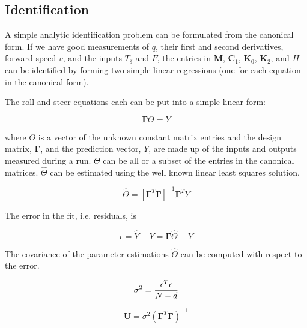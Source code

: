 \documentclass[a4paper]{article}
\begin{document}
\subsection{Identification}

A simple analytic identification problem can be formulated from the canonical
form. If we have good measurements of $q$, their first and second derivatives,
forward speed $v$, and the inputs $T_\delta$ and $F$, the entries in
$\mathbf{M}$, $\mathbf{C}_1$, $\mathbf{K}_0$, $\mathbf{K}_2$, and $H$ can be
identified by forming two simple linear regressions (one for each equation
in the canonical form).

The roll and steer equations each can be put into a simple linear form:

\begin{equation}
  \mathbf{\Gamma} \Theta = Y
\end{equation}

where $\Theta$ is a vector of the unknown constant matrix entries and the
design matrix, $\mathbf{\Gamma}$, and the prediction vector, $Y$, are made up
of the inputs and outputs measured during a run. $\Theta$ can be all or a
subset of the entries in the canonical matrices. $\hat{\Theta}$ can be
estimated using the well known linear least squares solution.

\begin{equation}
  \hat{\Theta} = [\mathbf{\Gamma}^T \mathbf{\Gamma}]^{-1} \mathbf{\Gamma}^T Y
  \label{eq:theta-estimate}
\end{equation}

The error in the fit, i.e. residuals, is

\begin{equation}
  \epsilon = \hat{Y} - Y = \mathbf{\Gamma} \hat{\Theta} - Y
  \label{eq:fit-error}
\end{equation}

The covariance of the parameter estimations $\hat{\Theta}$ can be computed with
respect to the error.

\begin{equation}
  \sigma^2 = \frac{\epsilon^T\epsilon}{N - d} \\
  \label{eq:fit-variance}
\end{equation}

\begin{equation}
  \mathbf{U} = \sigma^2 (\mathbf{\Gamma}^T \mathbf{\Gamma})^{-1}
  \label{eq:theta-covariance}
\end{equation}
\end{document}
